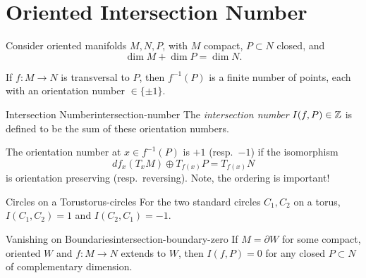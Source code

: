 
\section{Oriented Intersection Number}

Consider oriented manifolds $M, N, P$, with $M$ compact, $P \subset N$ closed, and
\[
    \dim M + \dim P = \dim N.
\]

If $f \colon M \to N$ is transversal to $P$, then $f^{-1}(P)$ is a finite number of points, each with an orientation number $\in \{\pm 1\}$.

\begin{definition}{Intersection Number}{intersection-number}
    The \emph{intersection number} $I(f, P) \in \mathbb{Z}$ is defined to be the sum of these orientation numbers.
\end{definition}

The orientation number at $x \in f^{-1}(P)$ is $+1$ (resp.\ $-1$) if the isomorphism
\[
    df_x(T_x M) \oplus T_{f(x)} P = T_{f(x)} N
\]
is orientation preserving (resp.\ reversing). Note, the ordering is important!

\begin{example}{Circles on a Torus}{torus-circles}
    For the two standard circles $C_1, C_2$ on a torus, $I(C_1, C_2) = 1$ and $I(C_2, C_1) = -1$.
\end{example}

\begin{center}
\end{center}

\begin{proposition}{Vanishing on Boundaries}{intersection-boundary-zero}
    If $M = \partial W$ for some compact, oriented $W$ and $f \colon M \to N$ extends to $W$, then $I(f, P) = 0$ for any closed $P \subset N$ of complementary dimension.
\end{proposition}

